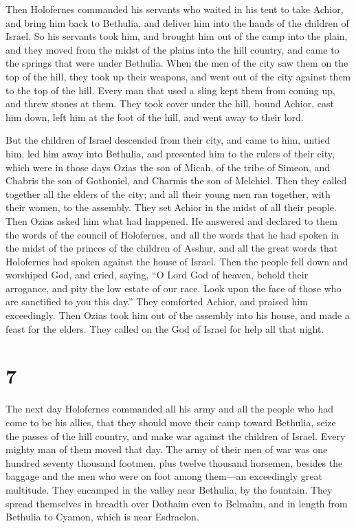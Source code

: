  Then Holofernes commanded his servants who waited in his
tent to take Achior, and bring him back to Bethulia, and deliver him
into the hands of the children of Israel.  So his servants
took him, and brought him out of the camp into the plain, and they moved
from the midst of the plains into the hill country, and came to the
springs that were under Bethulia.  When the men of the city
saw them on the top of the hill, they took up their weapons, and went
out of the city against them to the top of the hill. Every man that used
a sling kept them from coming up, and threw stones at them.
 They took cover under the hill, bound Achior, cast him
down, left him at the foot of the hill, and went away to their lord.

 But the children of Israel descended from their city, and
came to him, untied him, led him away into Bethulia, and presented him
to the rulers of their city,  which were in those days
Ozias the son of Micah, of the tribe of Simeon, and Chabris the son of
Gothoniel, and Charmis the son of Melchiel.  Then they
called together all the elders of the city; and all their young men ran
together, with their women, to the assembly. They set Achior in the
midst of all their people. Then Ozias asked him what had happened.
 He answered and declared to them the words of the council
of Holofernes, and all the words that he had spoken in the midst of the
princes of the children of Asshur, and all the great words that
Holofernes had spoken against the house of Israel.  Then
the people fell down and worshiped God, and cried, saying, 
``O Lord God of heaven, behold their arrogance, and pity the low estate
of our race. Look upon the face of those who are sanctified to you this
day.''  They comforted Achior, and praised him exceedingly.
 Then Ozias took him out of the assembly into his house,
and made a feast for the elders. They called on the God of Israel for
help all that night.

\hypertarget{section-6}{%
\section{7}\label{section-6}}

 The next day Holofernes commanded all his army and all the
people who had come to be his allies, that they should move their camp
toward Bethulia, seize the passes of the hill country, and make war
against the children of Israel.  Every mighty man of them
moved that day. The army of their men of war was one hundred seventy
thousand footmen, plus twelve thousand horsemen, besides the baggage and
the men who were on foot among them---an exceedingly great multitude.
 They encamped in the valley near Bethulia, by the fountain.
They spread themselves in breadth over Dothaim even to Belmaim, and in
length from Bethulia to Cyamon, which is near Esdraelon.

